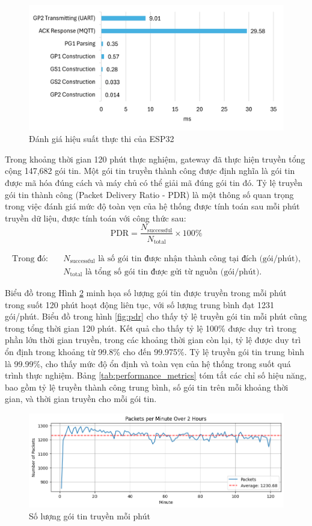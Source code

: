 \begin{figure}[H]
    \centering
    \includegraphics[width=0.75\linewidth]{esp32.png}
    \caption{Đánh giá hiệu suất thực thi của ESP32}
    \label{fig:esp32}
\end{figure}


Trong khoảng thời gian 120 phút thực nghiệm, gateway đã thực hiện truyền tổng cộng 147,682 gói tin. Một gói tin truyền thành công được định nghĩa là gói tin được mã hóa đúng cách và máy chủ có thể giải mã đúng gói tin đó. Tỷ lệ truyền gói tin thành công (Packet Delivery Ratio - PDR) là một thông số quan trọng trong việc đánh giá mức độ toàn vẹn của hệ thống được tính toán sau mỗi phút truyền dữ liệu, được tính toán với công thức sau:
\[
\text{PDR} = \frac{N_{\text{successful}}}{N_{\text{total}}} \times 100\% 
\]

\begin{align*}
\text{Trong đó:} \quad & N_{\text{successful}} \text{ là số gói tin được nhận thành công tại đích (gói/phút),} \\
                       & N_{\text{total}} \text{ là tổng số gói tin được gửi từ nguồn (gói/phút).}
\end{align*}

Biểu đồ trong Hình \ref{fig:packet} minh họa số lượng gói tin được truyền trong mỗi phút trong suốt 120 phút hoạt động liên tục, với số lượng trung bình đạt 1231 gói/phút. Biểu đồ trong hình \ref{fig:pdr} cho thấy tỷ lệ truyền gói tin mỗi phút cũng trong tổng thời gian 120 phút. Kết quả cho thấy tỷ lệ 100\% được duy trì trong phần lớn thời gian truyền, trong các khoảng thời gian còn lại, tỷ lệ được duy trì ổn định trong khoảng từ 99.8\% cho đến 99.975\%. Tỷ lệ truyền gói tin trung bình là 99.99\%, cho thấy mức độ ổn định và toàn vẹn của hệ thống trong suốt quá trình thực nghiệm. Bảng \ref{tab:performance_metrics} tóm tắt các chỉ số hiệu năng, bao gồm tỷ lệ truyền thành công trung bình, số gói tin trên mỗi khoảng thời gian, và thời gian truyền cho mỗi gói tin.

\begin{figure}[H]
    \centering
    \includegraphics[width=0.8\linewidth]{packet2.png}
    \caption{Số lượng gói tin truyền mỗi phút}
    \label{fig:packet}
\end{figure}

